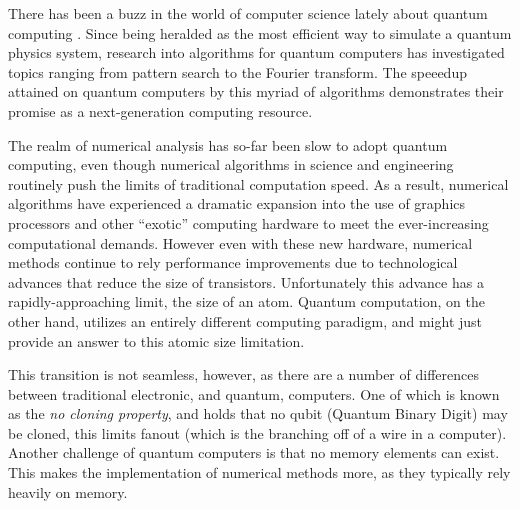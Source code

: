 
There has been a buzz in the world of computer science lately about
quantum computing \cite{sciam}. Since being heralded as the most
efficient way to simulate a quantum physics system, research into
algorithms for quantum computers has investigated topics ranging from
pattern search to the Fourier transform.  The speeedup attained on
quantum computers by this myriad of algorithms demonstrates their
promise as a next-generation computing resource. 


The realm of numerical analysis has so-far been slow to adopt quantum
computing, even though numerical algorithms in science and engineering
routinely push the limits of traditional computation speed.  As a
result, numerical algorithms have experienced a dramatic expansion
into the use of graphics processors and other ``exotic'' computing
hardware to meet the ever-increasing computational demands.
However even with these new hardware, numerical methods continue to
rely performance improvements due to technological advances that
reduce the size of transistors.  Unfortunately this advance has a
rapidly-approaching limit, the size of an atom.  Quantum computation,
on the other hand, utilizes an entirely different computing paradigm,
and might just provide an answer to this atomic size limitation.

This transition is not seamless, however, as there are a number of
differences between traditional electronic, and quantum, computers.  
One of which is known as the \emph{no cloning property}, and holds
that no qubit (Quantum Binary Digit) may be cloned, this limits fanout
(which is the branching off of a wire in a computer).  Another
challenge of quantum computers is that no memory elements can exist. 
This makes the implementation of numerical methods more, as they
typically rely heavily on memory.


